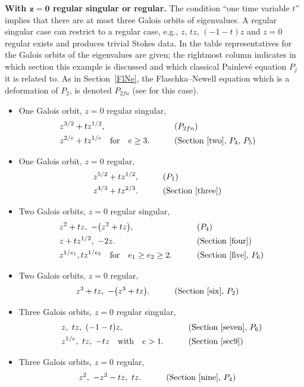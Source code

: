\documentclass[pdftex]{sigma}
\numberwithin{equation}{section}
\begin{document}
{\bf With $\boldsymbol{z=0}$ regular singular or regular.}
The condition ``one time variable $t$'' implies that there are at most three Galois orbits of eigenvalues.
A regular singular case can restrict to a regular case, e.g., $z$, $tz$, $(-1-t)z$ and $z=0$ regular exists and produces trivial Stokes data. In the table representatives for the Galois orbits of the eigenvalues are given; the rightmost column indicates
in which section this example is discussed and which classical Painlev\'{e} equation $P_j$ it is related to. As in Section~\ref{FlNe}, the Flaschka--Newell
equation which is a deformation of $P_2$, is denoted $P_{2fn}$ (see \cite[Section~4.9]{vdP-Sa} for this case).
\begin{itemize}\itemsep=0pt
\item One Galois orbit, $z=0$ regular singular,
\begin{alignat*}{3}
 & z^{3/2}+tz^{1/2}, && (P_{2fn}) &&\\
 & z^{2/e}+tz^{1/e} \quad \text{for} \quad e\geq 3 .\qquad && (\text{Section~\ref{two}},\, P_4,\,P_5)&&
\end{alignat*}
\item One Galois orbit, $ z=0 $ regular,
\begin{alignat*}{3}
 & z^{5/2}+tz^{1/2}, \qquad&& (P_1) && \\
 & z^{4/3}+tz^{2/3} . && (\text{Section~\ref{three}})&&
 \end{alignat*}
\item Two Galois orbits, $ z=0 $ regular singular,
\begin{alignat*}{3}
 & z^2+tz , \ -\bigl(z^2+tz\bigr), && (P_4) \\
 & z+tz^{1/2} ,\ -2z . && (\text{Section~\ref{four}}) \\
 & z^{1/e_1} , tz^{1/e_2}\quad \text{for} \quad e_1\geq e_2\geq 2 .\qquad&& (\text{Section~\ref{five}}, \, P_6)
 \end{alignat*}
\item Two Galois orbits, $ z=0 $ regular,
\begin{alignat*}{3}
& z^3+tz ,\ -\bigl(z^3+tz\bigr) .\qquad && (\text{Section \ref{six}},\, P_2)
\end{alignat*}
\item Three Galois orbits, $ z=0 $ regular singular,
\begin{alignat*}{3}
 & z ,\ tz , \ (-1-t)z , \qquad&& (\text{Section \ref{seven}},\, P_6) \\
& z^{1/e} ,\ tz , \ -tz \quad \text{with}\quad e>1 .\qquad&& (\text{Section~\ref{sec9}}) \end{alignat*}
\item Three Galois orbits, $ z=0 $ regular,
\begin{alignat*}{3}
&z^2 , \ -z^2-tz , \ tz . \qquad&& (\text{Section \ref{nine}},\, P_4)
\end{alignat*}
\end{itemize}
\end{document}
